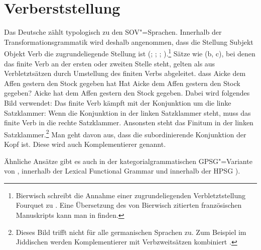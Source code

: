 \section{Verberststellung}
\label{sec-v1}\label{Abschnitt-V1}

Das Deutsche zählt typologisch zu den SOV"=Sprachen. Innerhalb der
Transformationsgrammatik 
wird deshalb angenommen, dass die Stellung Subjekt Objekt Verb die zugrundeliegende Stellung ist (\citealp{Bach62a}; \citealp*[]{Bierwisch63a};
\citealp{Reis74a}; \citealp[Kapitel~1]{Thiersch78a}).\footnote{%
  Bierwisch schreibt die Annahme einer zugrundeliegenden Verbletztstellung Fourquet
  zu \citep{Fourquet57a}. Eine Übersetzung des von Bierwisch zitierten
  französischen Manuskripts kann man in 
  finden.%
}
Sätze wie (b, c), bei denen das finite Verb an der ersten oder zweiten Stelle steht,
gelten als aus Verbletztsätzen durch Umstellung des finiten Verbs abgeleitet.
\eal
\ex dass Aicke dem Affen gestern den Stock gegeben hat
\ex Hat Aicke dem Affen gestern den Stock gegeben?
\ex Aicke hat dem Affen gestern den Stock gegeben.
\zl
Dabei wird folgendes Bild verwendet: Das finite Verb kämpft mit der Konjunktion um die linke Satzklammer:
Wenn die Konjunktion in der linken Satzklammer steht, muss das finite Verb in die rechte Satzklammer.
Ansonsten steht das Finitum in der linken Satzklammer.\footnote{
  Dieses Bild trifft nicht für alle germanischen Sprachen zu. Zum Beispiel im Jiddischen werden
  Komplementierer mit Verbzweitsätzen kombiniert \citep[]{Diesing2004a}.
} Man geht davon aus, dass die subordinierende Konjunktion
der Kopf ist. Diese wird auch Komplementierer genannt.

Ähnliche Ansätze gibt es auch in der kategorialgrammatischen GPSG"=Variante von \citet[]{Jacobs86a}, innerhalb der Lexical Functional Grammar \citep{Berman96a-u} und innerhalb der HPSG
\parencites{KW91a}{Oliva92a}{Netter92}{Frank94}{Kiss95a}{Feldhaus97}{Meurers2000b}{Mueller2005c,MuellerGS}).\addpages

